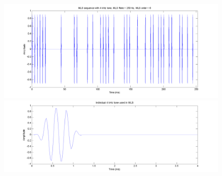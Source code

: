 \begin{figure}[H]
    \centering
    \begin{minipage}{0.48\textwidth}
        \includegraphics[width=\textwidth]{images/msl_sequence_with4kHztone.png}
    \end{minipage}
    \hfill
    \begin{minipage}{0.48\textwidth}
        \includegraphics[width=\textwidth]{images/individual4kHzToneInMLS.png}
    \end{minipage}
    
    \vspace{0.2cm}
    

\end{figure}
